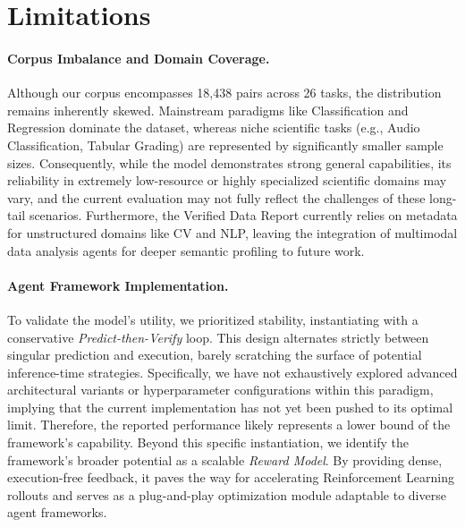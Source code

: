 \section*{Limitations}
\label{sec:limitation}

\paragraph{Corpus Imbalance and Domain Coverage.}
Although our corpus encompasses 18,438 pairs across 26 tasks, the distribution remains inherently skewed.
Mainstream paradigms like Classification and Regression dominate the dataset, whereas niche scientific tasks (e.g., Audio Classification, Tabular Grading) are represented by significantly smaller sample sizes.
Consequently, while the model demonstrates strong general capabilities, its reliability in extremely low-resource or highly specialized scientific domains may vary, and the current evaluation may not fully reflect the challenges of these long-tail scenarios.
Furthermore, the Verified Data Report currently relies on metadata for unstructured domains like CV and NLP, leaving the integration of multimodal data analysis agents for deeper semantic profiling to future work.


\paragraph{Agent Framework Implementation.}
To validate the model's utility, we prioritized stability, instantiating \ours with a conservative \textit{Predict-then-Verify} loop.
This design alternates strictly between singular prediction and execution, barely scratching the surface of potential inference-time strategies.
Specifically, we have not exhaustively explored advanced architectural variants or hyperparameter configurations within this paradigm, implying that the current implementation has not yet been pushed to its optimal limit.
Therefore, the reported performance likely represents a lower bound of the framework's capability.
Beyond this specific instantiation, we identify the framework's broader potential as a scalable \textit{Reward Model}.
By providing dense, execution-free feedback, it paves the way for accelerating Reinforcement Learning rollouts and serves as a plug-and-play optimization module adaptable to diverse agent frameworks.
